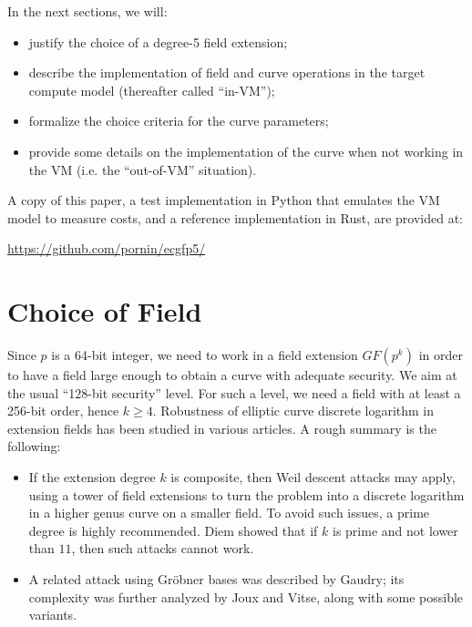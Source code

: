 \documentclass{llncs}
\newcommand{\GF}{GF}
\begin{document}
In the next sections, we will:
\begin{itemize}

    \item justify the choice of a degree-5 field extension;

    \item describe the implementation of field and curve operations in the
    target compute model (thereafter called ``in-VM'');

    \item formalize the choice criteria for the curve parameters;

    \item provide some details on the implementation of the curve when
    not working in the VM (i.e. the ``out-of-VM'' situation).

\end{itemize}

A copy of this paper, a test implementation in Python that emulates the
VM model to measure costs, and a reference implementation in Rust, are
provided at:
\begin{center}
    \url{https://github.com/pornin/ecgfp5/}
\end{center}

\section{Choice of Field}

Since $p$ is a 64-bit integer, we need to work in a field extension
$\GF(p^k)$ in order to have a field large enough to obtain a curve with
adequate security. We aim at the usual ``128-bit security'' level. For
such a level, we need a field with at least a 256-bit order, hence $k
\geq 4$. Robustness of elliptic curve discrete logarithm in extension
fields has been studied in various articles. A rough summary is the
following:
\begin{itemize}

    \item If the extension degree $k$ is composite, then Weil descent
    attacks may apply, using a tower of field extensions to turn the
    problem into a discrete logarithm in a higher genus curve on a
    smaller field\cite{GauHesSma2002,AriMatNagShi2004}. To avoid such
    issues, a prime degree is highly recommended. Diem showed that if
    $k$ is prime and not lower than $11$, then such attacks cannot
    work\cite{Die2003}.

    \item A related attack using Gröbner bases was described by
    Gaudry\cite{Gau2009}; its complexity was further analyzed by Joux
    and Vitse, along with some possible variants\cite{JouVit2013}.

\end{itemize}
\end{document}
